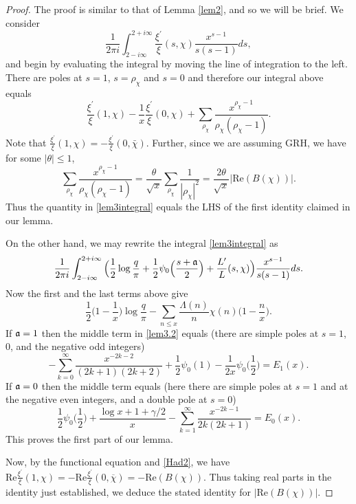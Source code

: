 \documentclass [12pt]{amsart}
\numberwithin{equation}{section}
\begin{document}
\begin{proof}  The proof is similar to that of Lemma \ref{lem2}, and so we will be 
brief. We  consider
\begin{equation}
\label{lem3integral}
\frac{1}{2\pi i} \int_{2-i\infty}^{2+i\infty} \frac{\xi^{\prime}}{\xi}(s,\chi) \frac{x^{s-1}}{s(s-1)} ds,
\end{equation}
and begin by evaluating the integral by moving the line of integration to the left.  There are
poles at $s=1$, $s=\rho_\chi$ and $s=0$ and therefore our integral above equals
$$
 \frac{\xi^{\prime}}{\xi}(1,\chi) -\frac{1}{x} \frac{\xi^{\prime}}{\xi}(0,\chi) +
\sum_{\rho_\chi} \frac{x^{\rho_\chi-1}}{\rho_\chi(\rho_\chi-1)}.
$$
Note that $\frac{\xi^{\prime}}{\xi}(1,\chi) = - \frac{\xi^{\prime}}{\xi}(0, \bar{\chi})$.  Further, since we are assuming GRH, we have for some $|\theta|\le 1$,
$$
\sum_{\rho_\chi} \frac{x^{\rho_\chi-1}}{\rho_\chi (\rho_\chi-1)} =\frac{ \theta }{\sqrt{x}} \sum_{\rho_\chi}
\frac{1}{|\rho_\chi|^2}= \frac{2\theta}{\sqrt{x}} |\text{Re}(B(\chi))|.
$$
Thus the quantity in \eqref{lem3integral} equals the LHS of the first identity claimed in 
our lemma.  

On the other hand, we may rewrite the integral \eqref{lem3integral} as
\begin{align}
\label{lem3.2}
\frac{1}{2\pi i} \int_{2-i\infty}^{2+i\infty}
\Big( \frac 12 \log \frac{q}{\pi} + \frac 12\psi_0\Big(\frac{s+\frak a}{2}\Big)
+ \frac{L^{\prime}}{L}(s,\chi)\Big) \frac{x^{s-1}}{s(s-1)} ds.
\end{align}
Now the first and the last terms above give
$$
\frac 12 \Big(1-\frac 1x\Big) \log \frac{q}{\pi}
- \sum_{n\le x} \frac{\Lambda(n)}{n} \chi(n) \Big(1-\frac nx\Big).
$$
If $\frak a=1$ then the middle term in \eqref{lem3.2} equals (there are simple
poles at $s=1$, $0$, and the negative odd integers)
$$
-\sum_{k=0}^{\infty} \frac{x^{-2k-2}}{(2k+1)(2k+2)} + \frac 12\psi_0(1)-
\frac{1}{2x} \psi_0\Big(\frac12\Big)
=E_1(x).
 $$
 If $\frak a=0$ then the middle term equals (here there are simple
 poles at $s=1$ and at the negative even integers, and a double pole at $s=0$)
 $$
 \frac{1}{2} \psi_0\Big(\frac 12\Big) +
 \frac{\log x+1+ \gamma/2}{x} - \sum_{k=1}^{\infty} \frac{x^{-2k-1}}{2k(2k+1)} = E_0(x).
 $$
This proves the first part of our lemma.

Now, by the functional equation and \eqref{Had2}, we have
$\text{Re} \frac{\xi^{\prime}}{\xi}(1,\chi) =- \text{Re} \frac{\xi^{\prime}}{\xi}(0,\overline{\chi})=
-\text{Re}(B(\chi))$.  Thus taking real parts in the identity just established, 
 we deduce the stated identity for $|\text{Re}(B(\chi))|$.
\end{proof}
\end{document}
